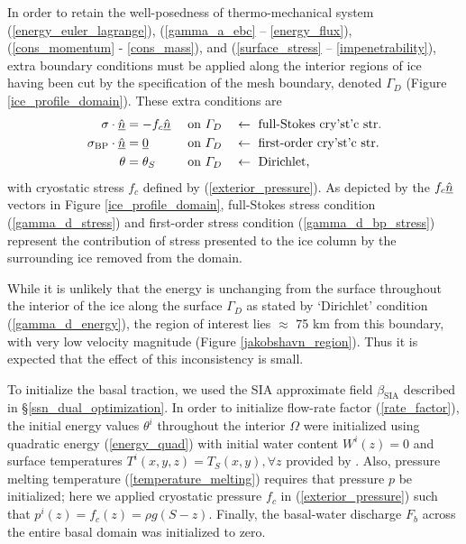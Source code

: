 In order to retain the well-posedness of thermo-mechanical system (\ref{energy_euler_lagrange}), (\ref{gamma_a_ebc} -- \ref{energy_flux}), (\ref{cons_momentum} - \ref{cons_mass}), and (\ref{surface_stress} -- \ref{impenetrability}), extra boundary conditions must be applied along the interior regions of ice having been cut by the specification of the mesh boundary, denoted $\Gamma_D$ (Figure \ref{ice_profile_domain}).  These extra conditions are
{\small
\begin{align}
  \label{gamma_d_stress}
  \sigma \cdot \underline{\hat{n}} &= - f_c \underline{\hat{n}} &&\text{ on } \varGamma_D &&\leftarrow \text{ full-Stokes cry'st'c str.} \\
  \label{gamma_d_bp_stress}
  \sigma_{\text{BP}} \cdot \underline{\hat{n}} &= \underline{0} &&\text{ on } \varGamma_D &&\leftarrow \text{ first-order cry'st'c str.} \\
  \label{gamma_d_energy}
  \theta &= \theta_S &&\text{ on } \varGamma_D &&\leftarrow \text{ Dirichlet},
\end{align}}
with cryostatic stress $f_c$ defined by (\ref{exterior_pressure}).  As depicted by the $f_c \underline{\hat{n}}$ vectors in Figure \ref{ice_profile_domain}, full-Stokes stress condition (\ref{gamma_d_stress}) and first-order stress condition (\ref{gamma_d_bp_stress}) represent the contribution of stress presented to the ice column by the surrounding ice removed from the domain.

While it is unlikely that the energy is unchanging from the surface throughout the interior of the ice along the surface $\Gamma_D$ as stated by `Dirichlet' condition (\ref{gamma_d_energy}), the region of interest lies $\approx$ 75 km from this boundary, with very low velocity magnitude (Figure \ref{jakobshavn_region}).  Thus it is expected that the effect of this inconsistency is small.

To initialize the basal traction, we used the SIA approximate field $\beta_{\text{SIA}}$ described in \S \ref{ssn_dual_optimization}.  In order to initialize flow-rate factor (\ref{rate_factor}), the initial energy values $\theta^i$ throughout the interior $\Omega$ were initialized using quadratic energy (\ref{energy_quad}) with initial water content $W^i(z) = 0$ and surface temperatures $T^i(x,y,z) = T_S(x,y), \forall z$ provided by \citet{fausto_2009}.  Also, pressure melting temperature (\ref{temperature_melting}) requires that pressure $p$ be initialized; here we applied cryostatic pressure $f_c$ in (\ref{exterior_pressure}) such that $p^i(z) = f_c(z) = \rho g (S - z)$.  Finally, the basal-water discharge $F_b$ across the entire basal domain was initialized to zero.

